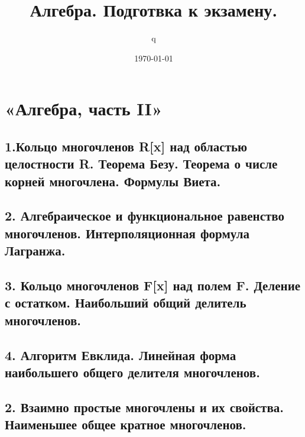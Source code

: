 \documentclass[11pt]{article}
\author{q}
\date{\today}
\title{Алгебра. Подготвка к экзамену.}
\begin{document}
\maketitle
\tableofcontents


\section{«Алгебра, часть II»}
\label{sec:orge8841ff}
\subsection{1.Кольцо многочленов R[x] над областью целостности R. Теорема Безу. Теорема о числе корней многочлена. Формулы Виета.}
\label{sec:org58b308d}




\subsection{2. Алгебраическое и функциональное равенство многочленов. Интерполяционная формула Лагранжа.}
\label{sec:orgcf976fc}




\subsection{3. Кольцо многочленов F[x] над полем F. Деление с остатком. Наибольший общий делитель многочленов.}
\label{sec:orga29fa8b}




\subsection{4. Алгоритм Евклида. Линейная форма наибольшего общего делителя многочленов.}
\label{sec:orge148261}




\subsection{2. Взаимно простые многочлены и их свойства. Наименьшее общее кратное многочленов.}
\label{sec:org927d353}



\end{document}
